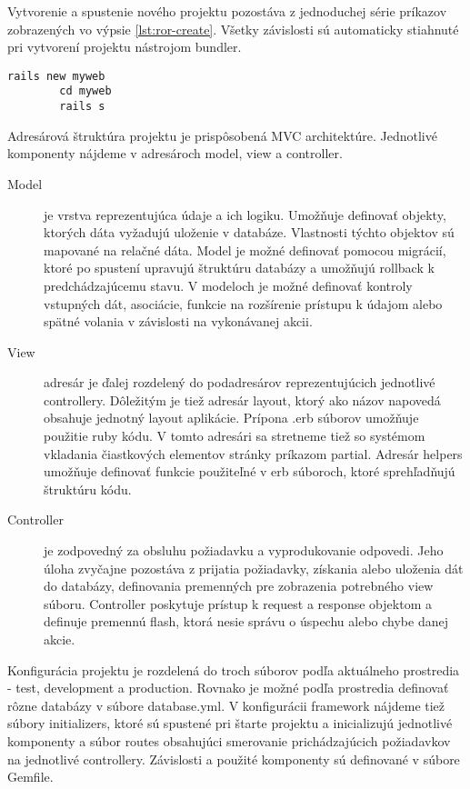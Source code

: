 	Vytvorenie a spustenie nového projektu pozostáva z jednoduchej série príkazov zobrazených vo výpsie \ref{lst:ror-create}. Všetky závislosti sú automaticky stiahnuté pri vytvorení projektu nástrojom bundler.
	\begin{lstlisting}[label=lst:ror-create,caption=Príklad vytvorenia a spustenia projektu v Ruby On Rails]
		rails new myweb
		cd myweb
		rails s
	\end{lstlisting}

	Adresárová štruktúra projektu je prispôsobená MVC architektúre. Jednotlivé komponenty nájdeme v adresároch model, view a controller.
	\begin{description}
		\item[Model] je vrstva reprezentujúca údaje a ich logiku. Umožňuje definovať objekty, ktorých dáta vyžadujú uloženie v databáze. Vlastnosti týchto objektov sú mapované na relačné dáta. Model je možné definovať pomocou migrácií, ktoré po spustení upravujú štruktúru databázy a umožňujú rollback k predchádzajúcemu stavu. V modeloch je možné definovať kontroly vstupných dát, asociácie, funkcie na rozšírenie prístupu k údajom alebo spätné volania v závislosti na vykonávanej akcii.
		\item[View] adresár je ďalej rozdelený do podadresárov reprezentujúcich jednotlivé controllery. Dôležitým je tiež adresár layout, ktorý ako názov napovedá obsahuje jednotný layout aplikácie. Prípona .erb súborov umožňuje použitie ruby kódu. V tomto adresári sa stretneme tiež so systémom vkladania čiastkových elementov stránky príkazom partial. Adresár helpers umožňuje definovať funkcie použiteľné v erb súboroch, ktoré sprehľadňujú štruktúru kódu.
		\item[Controller] je zodpovedný za obsluhu požiadavku a vyprodukovanie odpovedi. Jeho úloha zvyčajne pozostáva z prijatia požiadavky, získania alebo uloženia dát do databázy, definovania premenných pre zobrazenia potrebného view súboru. Controller poskytuje prístup k request a response objektom a definuje premennú flash, ktorá nesie správu o úspechu alebo chybe danej akcie.
	\end{description}
	
	Konfigurácia projektu je rozdelená do troch súborov podľa aktuálneho prostredia - test, development a production. Rovnako je možné podľa prostredia definovať rôzne databázy v súbore database.yml.
	V konfigurácii framework nájdeme tiež súbory initializers, ktoré sú spustené pri štarte projektu a inicializujú jednotlivé komponenty a súbor routes obsahujúci smerovanie prichádzajúcich požiadavkov na jednotlivé controllery. Závislosti a použité komponenty sú definované v súbore Gemfile.
	
